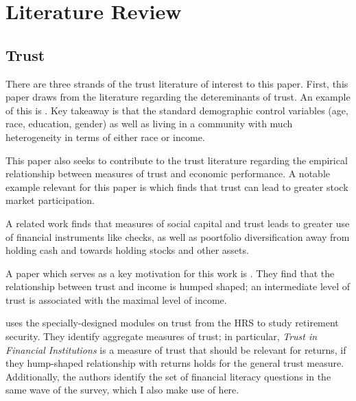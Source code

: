 \onlyinsubfile{\setcounter{section}{1}}
\section{Literature Review}\notinsubfile{\label{sec:litrev}}

\par

\subsection{Trust}

\par There are three strands of the trust literature of interest to this paper. First, this paper draws from the literature regarding the detereminants of trust. An example of this is \cite{Alesina2000}. Key takeaway is that the standard demographic control variables (age, race, education, gender) as well as living in a community with much heterogeneity in terms of either race or income.


\par This paper also seeks to contribute to the trust literature regarding the empirical relationship between measures of trust and economic performance. A notable example relevant for this paper is \cite{lgpslz2008} which finds that trust can lead to greater stock market participation. %

\par A related work \cite{Guiso2004} finds that measures of social capital and trust leads to greater use of financial instruments like checks, as well as poortfolio diversification away from holding cash and towards holding stocks and other assets. %

\par A paper which serves as a key motivation for this work is \cite{jbpglg2016}. They find that the relationship between trust and income is humped shaped; an intermediate level of trust is associated with the maximal level of income. %

\par \cite{Rosen2025} uses the specially-designed modules on trust from the HRS to study retirement security. They identify aggregate measures of trust; in particular, \textit{Trust in Financial Institutions} is a measure of trust that should be relevant for returns, if they hump-shaped relationship with returns holds for the general trust measure. Additionally, the authors identify the set of financial literacy questions in the same wave of the survey, which I also make use of here. %

